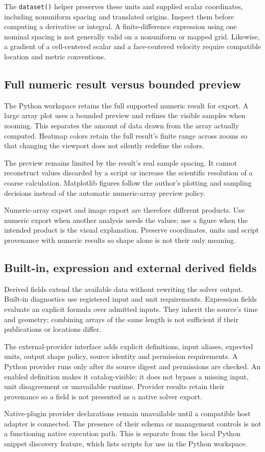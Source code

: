 The \texttt{dataset()} helper preserves these units and supplied scalar
coordinates, including nonuniform spacing and translated origins. Inspect them
before computing a derivative or integral. A finite-difference expression using
one nominal spacing is not generally valid on a nonuniform or mapped grid.
Likewise, a gradient of a cell-centered scalar and a face-centered velocity
require compatible location and metric conventions.

\subsection{Full numeric result versus bounded preview}
The Python workspace retains the full supported numeric result for export.
A large array plot uses a bounded preview and refines the visible samples when
zooming. This separates the amount of data drawn from the array actually
computed. Heatmap colors retain the full result's finite range across zooms so
that changing the viewport does not silently redefine the colors.

The preview remains limited by the result's real sample spacing. It cannot
reconstruct values discarded by a script or increase the scientific resolution
of a coarse calculation. Matplotlib figures follow the author's plotting and
sampling decisions instead of the automatic numeric-array preview policy.

Numeric-array export and image export are therefore different products. Use
numeric export when another analysis needs the values; use a figure when the
intended product is the visual explanation. Preserve coordinates, units and
script provenance with numeric results so shape alone is not their only meaning.

\subsection{Built-in, expression and external derived fields}
Derived fields extend the available data without rewriting the solver output.
Built-in diagnostics use registered input and unit requirements. Expression
fields evaluate an explicit formula over admitted inputs. They inherit the
source's time and geometry; combining arrays of the same length is not sufficient
if their publications or locations differ.

The external-provider interface adds explicit definitions, input aliases,
expected units, output shape policy, source identity and permission requirements.
A Python provider runs only after its source digest and permissions are checked.
An enabled definition makes it catalog-visible; it does not bypass a missing
input, unit disagreement or unavailable runtime. Provider results retain their
provenance so a field is not presented as a native solver export.

Native-plugin provider declarations remain unavailable until a compatible host
adapter is connected. The presence of their schema or management controls is
not a functioning native execution path. This is separate from the local Python
snippet discovery feature, which lists scripts for use in the Python workspace.
